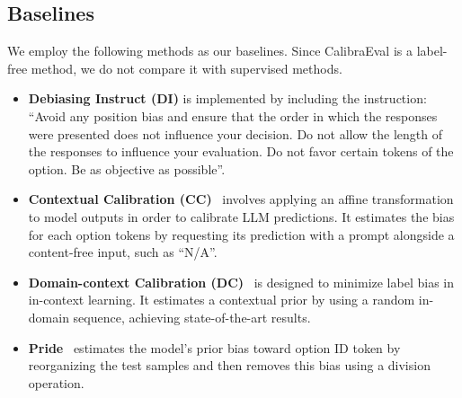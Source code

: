 \documentclass[sigconf]{acmart}
\begin{document}
\subsection{Baselines}
We employ the following methods as our baselines. Since CalibraEval is a label-free method, we do not compare it with supervised methods.
\begin{itemize}[leftmargin=*]
    \item \textbf{Debiasing Instruct (DI)} is implemented by including the instruction: ``Avoid any position bias and ensure that the order in which the responses were presented does not influence your decision. Do not allow the length of the responses to influence your evaluation. Do not favor certain tokens of the option. Be as objective as possible''.
    \item \textbf{Contextual Calibration (CC)}~\cite{zhao2021calibrate} involves applying an affine transformation to model outputs in order to calibrate LLM predictions. It estimates the bias for each option tokens by requesting its prediction with a prompt alongside a content-free input, such as ``N/A''.
    \item \textbf{Domain-context Calibration (DC)}~\cite{fei2023mitigating} is designed to minimize label bias in in-context learning. It estimates a contextual prior by using a random in-domain sequence, achieving state-of-the-art results.
    \item \textbf{Pride}~\cite{zheng2023large} estimates the model's prior bias toward option ID token by reorganizing the test samples and then removes this bias using a division operation.
\end{itemize}





\end{document}

